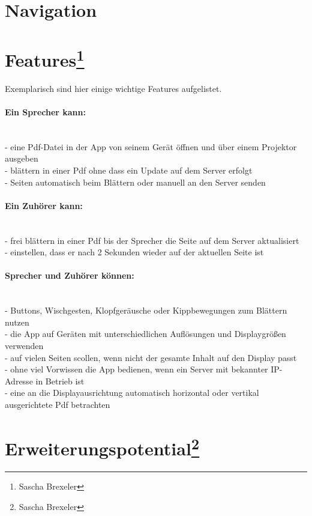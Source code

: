\newpage

\section{Navigation}




\section[Features]{Features\footnote{Sascha Brexeler}}

Exemplarisch sind hier einige wichtige Features aufgelistet.

\paragraph{Ein Sprecher kann:}$\;$\\
- eine Pdf-Datei in der App von seinem Gerät öffnen und über einem Projektor ausgeben\\
- blättern in einer Pdf ohne dass ein Update auf dem Server erfolgt\\
- Seiten automatisch beim Blättern oder manuell an den Server senden
\paragraph{Ein Zuhörer kann:}$\;$\\
- frei blättern in einer Pdf bis der Sprecher die Seite auf dem Server aktualisiert\\
- einstellen, dass er nach 2 Sekunden wieder auf der aktuellen Seite ist
\paragraph{Sprecher und Zuhörer können:}$\;$\\
- Buttons, Wischgesten, Klopfgeräusche oder Kippbewegungen zum Blättern nutzen\\
- die App auf Geräten mit unterschiedlichen Auflösungen und Displaygrößen verwenden\\
- auf vielen Seiten scollen, wenn nicht der gesamte Inhalt auf den Display passt\\
- ohne viel Vorwissen die App bedienen, wenn ein Server mit bekannter IP-Adresse in Betrieb ist\\
- eine an die Displayausrichtung automatisch horizontal oder vertikal ausgerichtete Pdf betrachten
\section[Erweiterungspotential]{Erweiterungspotential\footnote{Sascha Brexeler}}

